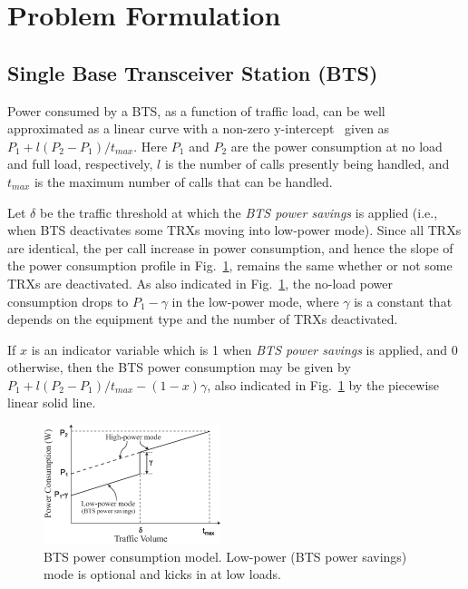 \section{Problem Formulation}
\label{sec:formulation}
\subsection{Single Base Transceiver Station (BTS)}
Power consumed by a BTS, as a function of traffic load, can be
well approximated as a linear curve with a non-zero
y-intercept~\cite{Peng:2011:BTSSaving:Mobicom} given as
$P_1+l(P_2-P_1)/t_{max}$. Here $P_1$ and $P_2$ are the power
consumption at no load and full load, respectively, $l$ is the
number of calls presently being handled, and $t_{max}$ is the
maximum number of calls that can be handled.

Let $\delta$ be the traffic threshold at which the \textit{BTS
power savings} is applied (i.e., when BTS deactivates some TRXs
moving into low-power mode). Since all TRXs are identical, the
per call increase in power consumption, and hence the slope of
the power consumption profile in Fig.~\ref{fig:powermodel1},
remains the same whether or not some TRXs are deactivated. As
also indicated in Fig.~\ref{fig:powermodel1}, the no-load power
consumption drops to $P_1-\gamma$ in the low-power mode, where
$\gamma$ is a constant that depends on the equipment type and
the number of TRXs deactivated.

If $x$ is an indicator variable which is 1 when \textit{BTS
power savings} is applied, and $0$ otherwise, then the BTS
power consumption may be given by $P_1+l(P_2-P_1)/t_{max} -
(1-x)\gamma$, also indicated in Fig.~\ref{fig:powermodel1} by
the piecewise linear solid line.

\begin{figure}
\centering
\includegraphics[width=0.46\textwidth]{figures/powermodel.eps}
\caption{BTS power consumption model. Low-power (BTS power savings) mode is optional and kicks in at low loads.}
\label{fig:powermodel1}
\end{figure}

